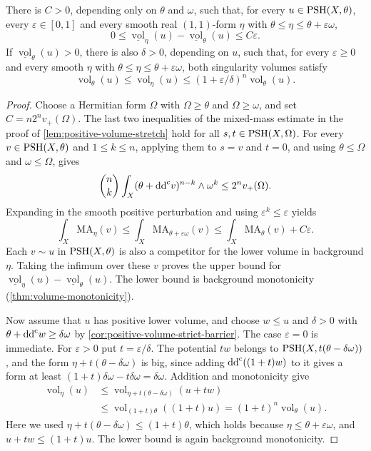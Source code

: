 \begin{proposition}\label{prop:positive-volume-background-comparison}
There is $C>0$, depending only on $\theta$ and $\omega$, such that, for every $u\in\mathrm{PSH}(X,\theta)$, every $\varepsilon\in[0,1]$ and every smooth real $(1,1)$-form $\eta$ with $\theta\leq\eta\leq\theta+\varepsilon\omega$,
\[
 0\leq\underline{\operatorname{vol}}_\eta(u)
       -\underline{\operatorname{vol}}_\theta(u)\leq C\varepsilon.
\]
If $\underline{\operatorname{vol}}_\theta(u)>0$, there is also $\delta>0$, depending on $u$, such that, for every $\varepsilon\geq0$ and every smooth $\eta$ with $\theta\leq\eta\leq\theta+\varepsilon\omega$, both singularity volumes satisfy
\[
 \operatorname{vol}_\theta(u)
 \leq\operatorname{vol}_\eta(u)
 \leq(1+\varepsilon/\delta)^n\operatorname{vol}_\theta(u).
\]
\end{proposition}
\begin{proof}
Choose a Hermitian form $\Omega$ with $\Omega\geq\theta$ and $\Omega\geq\omega$, and set $C=n2^n v_+(\Omega)$. The last two inequalities of the mixed-mass estimate in the proof of \cref{lem:positive-volume-stretch} hold for all $s,t\in\mathrm{PSH}(X,\Omega)$. For every $v\in\mathrm{PSH}(X,\theta)$ and $1\leq k\leq n$, applying them to $s=v$ and $t=0$, and using $\theta\leq\Omega$ and $\omega\leq\Omega$, gives
\[
 \binom nk\int_X(\theta+\mathrm{dd}^{\mathrm{c}} v)^{n-k}\wedge\omega^k
 \leq2^n v_+(\Omega).
\]
Expanding in the smooth positive perturbation and using $\varepsilon^k\leq\varepsilon$ yields
\[
 \int_X\mathrm{MA}_\eta(v)
 \leq\int_X\mathrm{MA}_{\theta+\varepsilon\omega}(v)
 \leq\int_X\mathrm{MA}_\theta(v)+C\varepsilon.
\]
Each $v\sim u$ in $\mathrm{PSH}(X,\theta)$ is also a competitor for the lower volume in background $\eta$. Taking the infimum over these $v$ proves the upper bound for $\underline{\operatorname{vol}}_\eta(u)-\underline{\operatorname{vol}}_\theta(u)$. The lower bound is background monotonicity (\cref{thm:volume-monotonicity}).

Now assume that $u$ has positive lower volume, and choose $w\leq u$ and $\delta>0$ with $\theta+\mathrm{dd}^{\mathrm{c}} w\geq\delta\omega$ by \cref{cor:positive-volume-strict-barrier}. The case $\varepsilon=0$ is immediate. For $\varepsilon>0$ put $t=\varepsilon/\delta$. The potential $tw$ belongs to $\mathrm{PSH}(X,t(\theta-\delta\omega))$, and the form $\eta+t(\theta-\delta\omega)$ is big, since adding $\mathrm{dd}^{\mathrm{c}}((1+t)w)$ to it gives a form at least $(1+t)\delta\omega-t\delta\omega=\delta\omega$. Addition and monotonicity give
\[
 \begin{split}
 \operatorname{vol}_\eta(u)
 &\leq\operatorname{vol}_{\eta+t(\theta-\delta\omega)}(u+tw)\\
 &\leq\operatorname{vol}_{(1+t)\theta}((1+t)u)
 =(1+t)^n\operatorname{vol}_\theta(u).
 \end{split}
\]
Here we used $\eta+t(\theta-\delta\omega)\leq(1+t)\theta$, which holds because $\eta\leq\theta+\varepsilon\omega$, and $u+tw\leq(1+t)u$. The lower bound is again background monotonicity.
\end{proof}

